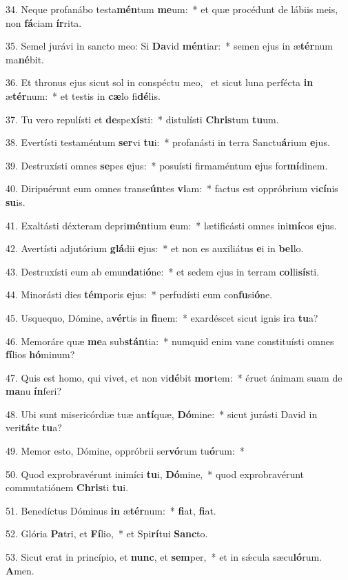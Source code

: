 34. Neque profanábo testa\textbf{mén}tum \textbf{me}um:~*  et quæ procédunt de lábiis meis, non \textbf{fá}ciam \textbf{ír}rita.\

35. Semel jurávi in sancto meo: Si \textbf{Da}vid \textbf{mén}tiar:~*  semen ejus in æ\textbf{tér}num ma\textbf{né}bit.\

36. Et thronus ejus sicut sol in conspéctu meo, \dag\  et sicut luna perfécta \textbf{in} æ\textbf{tér}num:~*  et testis in \textbf{cæ}lo fi\textbf{dé}lis.\

37. Tu vero repulísti et \textbf{de}spe\textbf{xís}ti:~*  distulísti \textbf{Chris}tum \textbf{tu}um.\

38. Evertísti testaméntum \textbf{ser}vi \textbf{tu}i:~*  profanásti in terra Sanctu\textbf{á}rium \textbf{e}jus.\

39. Destruxísti omnes \textbf{se}pes \textbf{e}jus:~*  posuísti firmaméntum \textbf{e}jus for\textbf{mí}dinem.\

40. Diripuérunt eum omnes transe\textbf{ún}tes \textbf{vi}am:~*  factus est oppróbrium vi\textbf{cí}nis \textbf{su}is.\

41. Exaltásti déxteram depri\textbf{mén}tium \textbf{e}um:~*  lætificásti omnes ini\textbf{mí}cos \textbf{e}jus.\

42. Avertísti adjutórium \textbf{glá}dii \textbf{e}jus:~*  et non es auxiliátus \textbf{e}i in \textbf{bel}lo.\

43. Destruxísti eum ab emun\textbf{da}ti\textbf{ó}ne:~*  et sedem ejus in terram \textbf{col}li\textbf{sís}ti.\

44. Minorásti dies \textbf{tém}poris \textbf{e}jus:~*  perfudísti eum con\textbf{fu}si\textbf{ó}ne.\

45. Usquequo, Dómine, a\textbf{vér}tis in \textbf{fi}nem:~*  exardéscet sicut ignis \textbf{i}ra \textbf{tu}a?\

46. Memoráre quæ \textbf{me}a sub\textbf{stán}tia:~*  numquid enim vane constituísti omnes \textbf{fí}lios \textbf{hó}minum?\

47. Quis est homo, qui vivet, et non vi\textbf{dé}bit \textbf{mor}tem:~*  éruet ánimam suam de \textbf{ma}nu \textbf{ín}feri?\

48. Ubi sunt misericórdiæ tuæ an\textbf{tí}quæ, \textbf{Dó}mine:~*  sicut jurásti David in veri\textbf{tá}te \textbf{tu}a?\

49. Memor esto, Dómine, oppróbrii ser\textbf{vó}rum tu\textbf{ó}rum:~*  \

50. Quod exprobravérunt inimíci \textbf{tu}i, \textbf{Dó}mine,~*  quod exprobravérunt commutatiónem \textbf{Chris}ti \textbf{tu}i.\

51. Benedíctus Dóminus \textbf{in} æ\textbf{tér}num:~*  \textbf{fi}at, \textbf{fi}at.\

52. Glória \textbf{Pa}tri, et \textbf{Fí}lio,~*  et Spi\textbf{rí}tui \textbf{Sanc}to.\

53. Sicut erat in princípio, et \textbf{nunc}, et \textbf{sem}per,~*  et in sǽcula sæcu\textbf{ló}rum. \textbf{A}men.\

